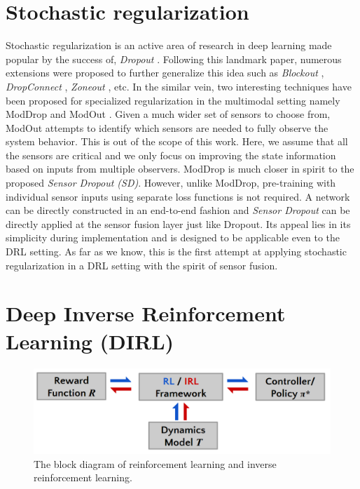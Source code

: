 \documentclass[../thesis.tex]{subfiles}
\begin{document}
 
\section{Stochastic regularization}
 
Stochastic regularization is an active area of research in deep learning made popular by the success of, \textit{Dropout} \cite{dropout}. Following this landmark paper, numerous extensions were proposed to further generalize this idea such as \textit{Blockout} \cite{blockout}, \textit{DropConnect} \cite{dropconnect}, \textit{Zoneout} \cite{zoneout}, etc. In the similar vein, two interesting techniques have been proposed for specialized regularization in the multimodal setting namely ModDrop \cite{moddrop} and ModOut \cite{modout}.
Given a much wider set of sensors to choose from, ModOut attempts to identify which sensors are needed to fully observe the system behavior. This is out of the scope of this work. Here, we assume that all the sensors are critical and we only focus on improving the state information based on inputs from multiple observers.
ModDrop is much closer in spirit to the proposed \emph{Sensor Dropout (SD)}. However, unlike ModDrop, pre-training with individual sensor inputs using separate loss functions is not required. A network can be directly constructed in an end-to-end fashion and \emph{Sensor Dropout} can be directly applied at the sensor fusion layer just like Dropout. Its appeal lies in its simplicity during implementation and is designed to be applicable even to the DRL setting. As far as we know, this is the first attempt at applying stochastic regularization in a DRL setting with the spirit of sensor fusion.
 
 
 
\section{Deep Inverse Reinforcement Learning (DIRL)}
\label{sec:dirl_intro}
 
 
\begin{figure}[t]
      \begin{center}
       \centerline{\includegraphics[width=0.5\columnwidth]{./DIRL/fig/irl_rl_pipeline.png}}
            \caption{The block diagram of reinforcement learning and inverse reinforcement learning.}
            \label{fig:irl_rl}
      \end{center}
\end{figure}
 
\end{document}
